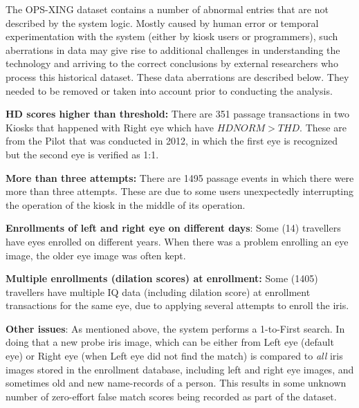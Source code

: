 \documentclass{cta-author}%
\begin{document}
The OPS-XING dataset contains a number of abnormal entries that are not described by the system logic. 
Mostly caused by human error or temporal experimentation with the system (either by kiosk users or programmers), such aberrations in data may give rise to additional challenges in understanding the technology and arriving to the correct conclusions by  external researchers who  process this historical dataset. These data aberrations are described below. 
They needed to be removed or taken into account  prior to conducting the analysis. 

\textbf{HD scores higher than threshold:} There are 351 passage transactions in two Kiosks 
that happened with Right eye  which have $HDNORM > THD$. These are from the Pilot  that was conducted in 2012, in which the first eye is recognized but the second eye is verified as 1:1. 

\textbf{More than three  attempts:} There are 1495 passage events in which there were more than three  attempts.
These are due to  some users unexpectedly interrupting the operation of the kiosk in the middle of its operation.

\textbf{Enrollments of left and right eye on different days}: Some 
(14) 
travellers have eyes enrolled on different years.  When there was a problem enrolling an eye image, the older eye image was often kept.

\textbf{Multiple enrollments (dilation scores) at enrollment:} Some 
(1405) 
travellers have multiple IQ data (including dilation score) at enrollment transactions for the same eye, due to applying several attempts to enroll the iris.


\textbf{Other issues}:  
As mentioned above, the system performs a 1-to-First search. In doing that a new probe iris image, which can be either from  Left eye (default eye) or Right eye (when Left eye did not find the match) is compared to \textit{all} iris images stored in the enrollment database, including left and right eye images, and sometimes old and new name-records of a person.  
This results in some unknown number of zero-effort false match scores being recorded as part of the dataset.
\end{document}
